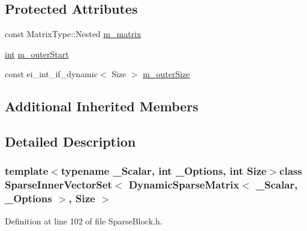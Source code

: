 \subsection*{Protected Attributes}
\begin{DoxyCompactItemize}
\item 
const Matrix\-Type\-::\-Nested \hyperlink{class_sparse_inner_vector_set_3_01_dynamic_sparse_matrix_3_01___scalar_00_01___options_01_4_00_01_size_01_4_a1e453ef7a0b6c4975644e4a8f9df467b}{m\-\_\-matrix}
\item 
\hyperlink{ioapi_8h_a787fa3cf048117ba7123753c1e74fcd6}{int} \hyperlink{class_sparse_inner_vector_set_3_01_dynamic_sparse_matrix_3_01___scalar_00_01___options_01_4_00_01_size_01_4_ae47f8e9fa90a7fcb101a41a401540716}{m\-\_\-outer\-Start}
\item 
const ei\-\_\-int\-\_\-if\-\_\-dynamic$<$ Size $>$ \hyperlink{class_sparse_inner_vector_set_3_01_dynamic_sparse_matrix_3_01___scalar_00_01___options_01_4_00_01_size_01_4_a9a94fe09136686d025654191e18aa85f}{m\-\_\-outer\-Size}
\end{DoxyCompactItemize}
\subsection*{Additional Inherited Members}


\subsection{Detailed Description}
\subsubsection*{template$<$typename \-\_\-\-Scalar, int \-\_\-\-Options, int Size$>$class Sparse\-Inner\-Vector\-Set$<$ Dynamic\-Sparse\-Matrix$<$ \-\_\-\-Scalar, \-\_\-\-Options $>$, Size $>$}



Definition at line 102 of file Sparse\-Block.\-h.




